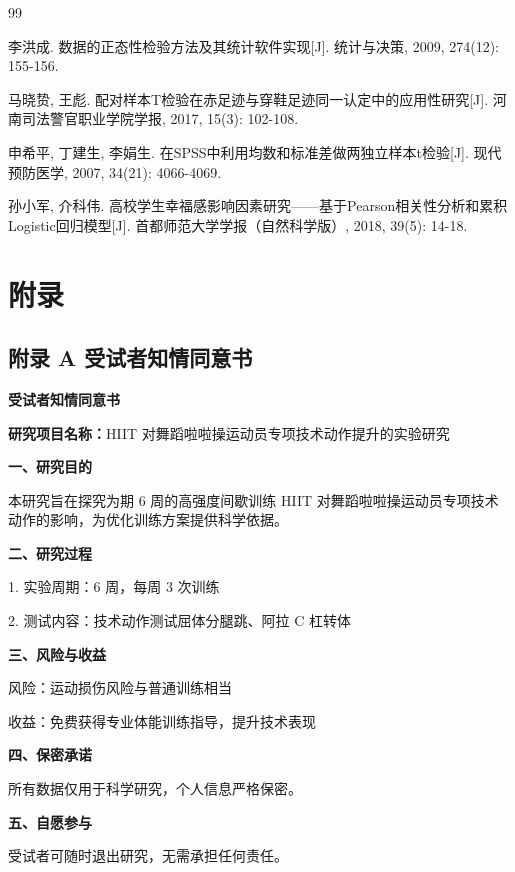 \documentclass[a4paper,12pt]{article}
\begin{document}
\begin{thebibliography}{99}
{
李洪成. 数据的正态性检验方法及其统计软件实现[J]. 统计与决策, 2009, 274(12): 155-156.

马晓贽, 王彪. 配对样本T检验在赤足迹与穿鞋足迹同一认定中的应用性研究[J]. 河南司法警官职业学院学报, 2017, 15(3): 102-108.

申希平, 丁建生, 李娟生. 在SPSS中利用均数和标准差做两独立样本t检验[J]. 现代预防医学, 2007, 34(21): 4066-4069.

孙小军, 介科伟. 高校学生幸福感影响因素研究——基于Pearson相关性分析和累积Logistic回归模型[J]. 首都师范大学学报（自然科学版）, 2018, 39(5): 14-18.

}
\end{thebibliography}

\cleardoublepage
\section*{附\quad 录}

\subsection*{附录 A 受试者知情同意书}

\begin{center}
	\textbf{受试者知情同意书}
\end{center}

\noindent\textbf{研究项目名称：}HIIT 对舞蹈啦啦操运动员专项技术动作提升的实验研究

\noindent\textbf{一、研究目的}

本研究旨在探究为期 6 周的高强度间歇训练 HIIT 对舞蹈啦啦操运动员专项技术动作的影响，为优化训练方案提供科学依据。

\noindent\textbf{二、研究过程}

1. 实验周期：6 周，每周 3 次训练

2. 测试内容：技术动作测试屈体分腿跳、阿拉 C 杠转体


\noindent\textbf{三、风险与收益}

风险：运动损伤风险与普通训练相当

收益：免费获得专业体能训练指导，提升技术表现

\noindent\textbf{四、保密承诺}

所有数据仅用于科学研究，个人信息严格保密。

\noindent\textbf{五、自愿参与}

受试者可随时退出研究，无需承担任何责任。
\end{document}

